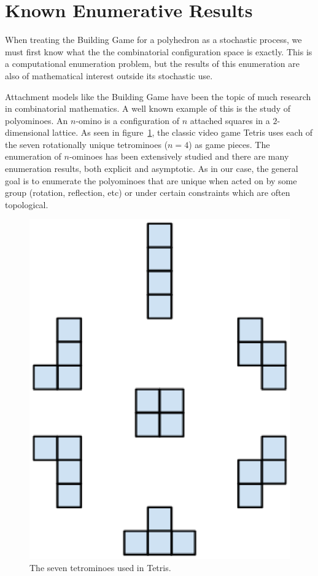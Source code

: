 \section{Known Enumerative Results}

When treating the Building Game for a polyhedron as a stochastic process, we must first know what the the combinatorial configuration space is exactly. This is a computational enumeration problem, but the results of this enumeration are also of mathematical interest outside its stochastic use.

Attachment models like the Building Game have been the topic of much research in combinatorial mathematics. A well known example of this is the study of polyominoes. An $n$-omino is a configuration of $n$ attached squares in a $2$-dimensional lattice. As seen in figure~\ref{fig:Tetris}, the classic video game Tetris uses each of the seven rotationally unique tetrominoes ($n = 4$) as game pieces. The enumeration of $n$-ominoes has been extensively studied and there are many enumeration results, both explicit and asymptotic. As in our case, the general goal is to enumerate the polyominoes that are unique when acted on by some group (rotation, reflection, etc) or under certain constraints which are often topological.
\begin{figure}[ht]
  \includegraphics[scale=0.25, angle=0]{images/tetris.eps}
\caption{The seven tetrominoes used in Tetris.}
\label{fig:Tetris}
\end{figure}

